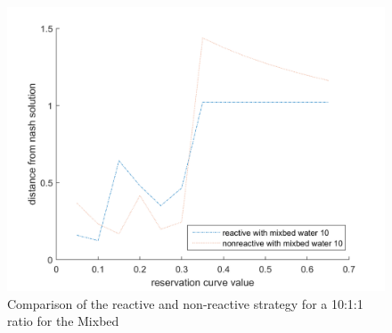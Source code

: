 \begin{figure}[h]
	\centering
	\includegraphics[width=0.7\linewidth]{img/reactivevsnonreactive_Mixbed10}
	\caption{Comparison of the reactive and non-reactive strategy for a 10:1:1 ratio for the Mixbed}
	\label{fig:reactivevsnonreactiveMixbed10}
\end{figure}

